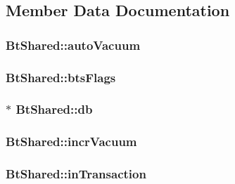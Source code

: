 \subsection{Member Data Documentation}
\hypertarget{struct_bt_shared_a770c4f6244d4350f27029cb909902a61}{
\subsubsection[{auto\-Vacuum}]{ Bt\-Shared\-::auto\-Vacuum}}\label{struct_bt_shared_a770c4f6244d4350f27029cb909902a61}
\hypertarget{struct_bt_shared_a287b7749063c63e45518f72d6f9b3c1d}{
\subsubsection[{bts\-Flags}]{ Bt\-Shared\-::bts\-Flags}}\label{struct_bt_shared_a287b7749063c63e45518f72d6f9b3c1d}
\hypertarget{struct_bt_shared_a93dafa672793f6117a336d5987951c8e}{
\subsubsection[{db}]{$\ast$ Bt\-Shared\-::db}}\label{struct_bt_shared_a93dafa672793f6117a336d5987951c8e}
\hypertarget{struct_bt_shared_a8d8ba06335a63d8a36294a0f1ae8377a}{
\subsubsection[{incr\-Vacuum}]{ Bt\-Shared\-::incr\-Vacuum}}\label{struct_bt_shared_a8d8ba06335a63d8a36294a0f1ae8377a}
\hypertarget{struct_bt_shared_aeaa6c0f33b83434ecee4bd8c4c8df48e}{
\subsubsection[{in\-Transaction}]{ Bt\-Shared\-::in\-Transaction}}\label{struct_bt_shared_aeaa6c0f33b83434ecee4bd8c4c8df48e}

